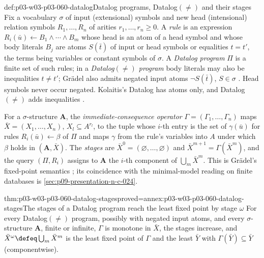 \begin{hbdefinition}{def:p03-w03-p03-060-datalog}{Datalog programs, Datalog\((\neq)\) and their stages}
Fix a vocabulary \(\sigma\) of input (extensional) symbols and new head
(intensional) relation symbols \(R_1,\ldots,R_n\) of arities
\(r_1,\ldots,r_n\ge0\). A \emph{rule} is an expression
\(R_i(\bar u)\leftarrow B_1\wedge\cdots\wedge B_m\) whose head is an atom of
a head symbol and whose body literals \(B_j\) are atoms \(S(\bar t)\) of
input or head symbols or equalities \(t=t'\), the terms being variables or
constant symbols of \(\sigma\). A \emph{Datalog program} \(\Pi\) is a finite
set of such rules; in a \emph{Datalog\((\neq)\) program} body literals may
also be inequalities \(t\neq t'\); Gr\"adel also admits negated input atoms
\(\neg S(\bar t)\), \(S\in\sigma\) \cite[Def.~3.3.57,
p.~180]{Gradel2007FMTDescriptiveChapter}. Head symbols never occur
negated. Kolaitis's Datalog has atoms only, and Datalog\((\neq)\) adds
inequalities \cite[pp.~42 and~44]{Kolaitis2003ExpressivePowerNotes}.

For a \(\sigma\)-structure \(\mathbf A\), the \emph{immediate-consequence
operator} \(\Gamma=(\Gamma_1,\ldots,\Gamma_n)\) maps
\(\bar X=(X_1,\ldots,X_n)\), \(X_l\subseteq A^{r_l}\), to the tuple whose
\(i\)-th entry is the set of \(\gamma(\bar u)\) for rules
\(R_i(\bar u)\leftarrow\beta\) of \(\Pi\) and maps \(\gamma\) from the
rule's variables into \(A\) under which \(\beta\) holds in
\((\mathbf A,\bar X)\). The \emph{stages} are
\(\bar X^0=(\varnothing,\ldots,\varnothing)\) and
\(\bar X^{m+1}=\Gamma(\bar X^m)\), and the query \((\Pi,R_i)\) assigns to
\(\mathbf A\) the \(i\)-th component of \(\bigcup_m\bar X^m\). This is
Gr\"adel's fixed-point semantics \cite[text before and in Def.~3.3.62,
p.~181]{Gradel2007FMTDescriptiveChapter}; its coincidence with the
minimal-model reading on finite databases is
\cref{sec:p09-presentation-n-c-024}.
\end{hbdefinition}

\begin{hblemma}{thm:p03-w03-p03-060-datalog-stages}{proved=annex:p03-w03-p03-060-datalog-stages}{The stages of a Datalog program reach the least fixed point by stage \(\omega\)}
For every Datalog\((\neq)\) program, possibly with negated input atoms, and
every \(\sigma\)-structure \(\mathbf A\), finite or infinite, \(\Gamma\) is
monotone in \(\bar X\), the stages increase, and
\(\bar X^\omega\defeq\bigcup_m\bar X^m\) is the least fixed point of
\(\Gamma\) and the least \(\bar Y\) with \(\Gamma(\bar Y)\subseteq\bar Y\)
(componentwise).
\end{hblemma}

